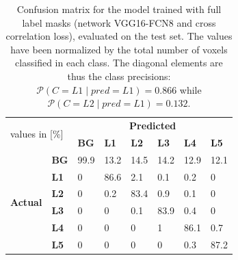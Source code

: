 \begin{table}
 

\begin{tabular}{cl|llllll}
    \toprule
    \multicolumn{2}{l|}{\multirow{2}{*}{values in {[}\%{]}}} & \multicolumn{6}{c}{\textbf{Predicted}}                                            \\
    \multicolumn{2}{l|}{}                                    & \textbf{BG} & \textbf{L1} & \textbf{L2} & \textbf{L3} & \textbf{L4} & \textbf{L5} \\ \hline
    \multirow{6}{*}{\textbf{Actual}}      & \textbf{BG}      & 99.9        & 13.2        & 14.5        & 14.2        & 12.9        & 12.1        \\
     & \textbf{L1} & 0 & 86.6 & 2.1  & 0.1  & 0.2  & 0    \\
     & \textbf{L2} & 0 & 0.2  & 83.4 & 0.9  & 0.1  & 0    \\
     & \textbf{L3} & 0 & 0    & 0.1  & 83.9 & 0.4  & 0    \\
     & \textbf{L4} & 0 & 0    & 0    & 1    & 86.1 & 0.7  \\
     & \textbf{L5} & 0 & 0    & 0    & 0    & 0.3  & 87.2 \\ \bottomrule
    \end{tabular}

    \caption{Confusion matrix for the model trained with full label masks (network VGG16-FCN8 and cross correlation loss), evaluated on the test set.
    The values have been normalized by the total number of voxels classified in each class.
    The diagonal elements are thus the class precisions: $\mathcal{P}(C = L1 \mid pred = L1) = 0.866$ while $\mathcal{P}(C = L2 \mid pred = L1) = 0.132$.
    }
\end{table}

